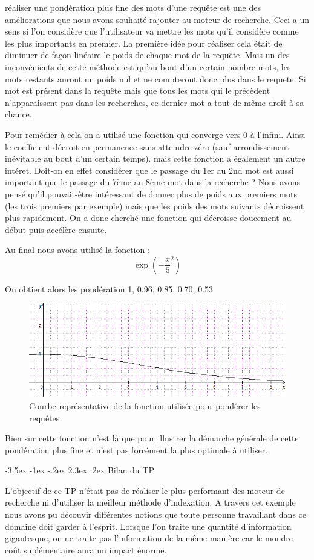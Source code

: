 \documentclass[a4paper,12pt]{article}
\makeatletter
\renewcommand\section{\@startsection {section}{1}{\z@}%
                           {-3.5ex \@plus -1ex \@minus -.2ex}%
                           {2.3ex \@plus.2ex}%
                           {\normalfont\Large\bfseries}}
\makeatother
\begin{document}
réaliser une pondération plus fine des mots d'une requête est une des améliorations que nous avons souhaité rajouter au moteur de recherche. Ceci a un sens si l'on
considère que l'utilisateur va mettre les mots qu'il considère comme les plus importants en premier. La première idée pour réaliser cela était de diminuer de façon linéaire le poids de chaque mot de la requête.
Mais un des inconvénients de cette méthode est qu'au bout d'un certain nombre mots, les mots restants auront un poids nul et ne compteront donc plus dans le requete. Si mot est présent dans la requête mais que tous les mots qui le précèdent n'apparaissent pas dans les recherches, ce dernier mot a tout de même droit à sa chance.

Pour remédier à cela on a utilisé une fonction qui converge vers 0 à l'infini. Ainsi le coefficient décroit en permanence sans atteindre zéro (sauf arrondissement inévitable au bout d'un certain temps).
mais cette fonction a également un autre intéret. Doit-on en effet considérer que le passage du 1er au 2nd mot est aussi important que le passage du 7ème au 8ème mot dans la recherche ? Nous avons pensé qu'il pouvait-être
intéressant de donner plus de poids aux premiers mots (les trois premiers par exemple) mais que les poids des mots suivants décroissent plus rapidement. On a donc cherché une fonction qui décroisse doucement au début puis accélère ensuite.

Au final nous avons utilisé la fonction : \[\exp(-\frac{x}{5}^{2})\]

On obtient alors les pondération 1, 0.96, 0.85, 0.70, 0.53

\begin{figure}[H]
	\center
	\includegraphics{courbe.png}
	\caption{Courbe représentative de la fonction utilisée pour pondérer les requêtes}
\end{figure}

Bien sur cette fonction n'est là que pour illustrer la démarche générale de cette pondération plus fine et n'est pas forcément la plus optimale à utiliser.

\section{Bilan du TP}

L'objectif de ce TP n'était pas de réaliser le plus performant des moteur de recherche ni d'utiliser la meilleur méthode d'indexation. A travers cet exemple nous avons pu découvir différentes notions
que toute personne travaillant dans ce domaine doit garder à l'esprit. Lorsque l'on traite une quantité d'information gigantesque, on ne traite pas l'information de la même manière car le mondre coût suplémentaire
aura un impact énorme.
\end{document}
